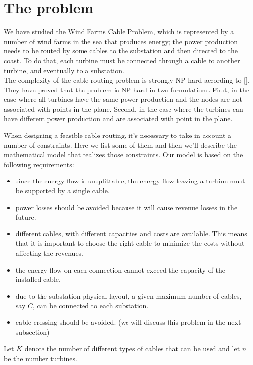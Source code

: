 
\chapter{The problem}
\label{chp:2-Model}

We have studied the Wind Farms Cable Problem, which is represented by a number of wind farms in the sea that produces energy; the power production needs to be routed by some cables to the substation and then directed to the coast.
To do that, each turbine must be connected through a cable to another turbine, and eventually to a substation.\\

The complexity of the cable routing problem is strongly NP-hard according to [\cite{wfcp}]. They have proved that the problem is NP-hard in two formulations. First, in the case where all turbines have the same power production and the nodes are not associated with points in the plane. Second, in the case where the turbines can have different power production and are associated with point in the plane. 

When designing a feasible cable routing, it's necessary to take in account a number of constraints. Here we list some of them and then we'll describe the mathematical model that realizes those constraints. Our model is based on the following requirements:

\begin{itemize}
\item since the energy flow is unsplittable, the energy flow leaving a turbine must be supported by a single cable.
\item power losses should be avoided because it will cause revenue losses in the future.
\item different cables, with different capacities and costs are available. This means that it is important to choose the right cable to minimize the costs without affecting the revenues. 
\item the energy flow on each connection cannot exceed the capacity of the installed cable.
\item due to the substation physical layout, a given maximum number of cables, say $C$, can be connected to each substation.
\item cable crossing should be avoided. (we will discuss this problem in the next subsection)
\end{itemize}
Let $K$ denote the number of different types of cables that can be used and let $n$ be the number turbines. 

